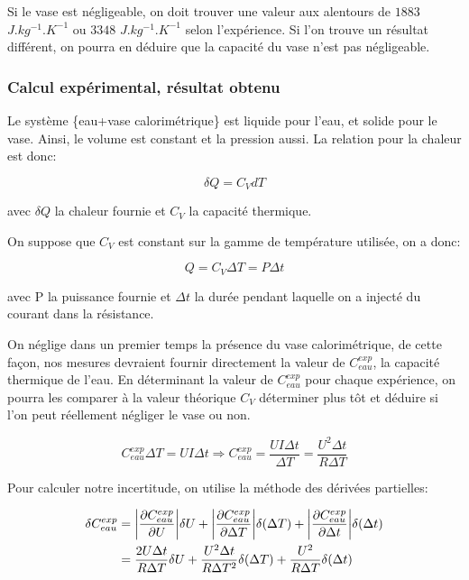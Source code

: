 \documentclass[12pt]{article}
\begin{document}
Si le vase est négligeable, on doit trouver une valeur aux alentours de $1883$ $J.kg^{-1}.K^{-1}$ ou $3348$ $J.kg^{-1}.K^{-1}$ selon l'expérience. Si l'on trouve un résultat différent, 
on pourra en déduire que la capacité du vase n'est pas négligeable.

\subsubsection{Calcul expérimental, résultat obtenu}
Le système \{eau+vase calorimétrique\} est liquide pour l'eau, et solide pour le vase.
Ainsi, le volume est constant et la pression aussi. La relation pour la chaleur est donc:

\begin{equation}
\delta Q=C_VdT
\end{equation}

avec $\delta Q$ la chaleur fournie et $C_V$ la capacité thermique. 

On suppose que $C_V$ est constant sur la gamme de température utilisée, on a donc:

\begin{equation}
Q = C_V\Delta T = P\Delta t
\end{equation}

avec P la puissance fournie et $\Delta t$ la durée pendant laquelle on a injecté du courant dans la résistance.

On néglige dans un premier temps la présence du vase calorimétrique, de cette façon, nos mesures devraient fournir directement la valeur de $C_{eau}^{exp}$, la capacité thermique de l'eau.
En déterminant la valeur de $C_{eau}^{exp}$ pour chaque expérience, on pourra les comparer à la valeur théorique $C_V$ déterminer plus tôt et déduire si l'on peut réellement négliger le vase ou non.

\begin{equation}
	C_{eau}^{exp} \Delta T = U I \Delta t \Rightarrow C_{eau}^{exp} = \frac{U I \Delta t}{\Delta T} = \frac{U^2\Delta t}{R \Delta T}
\end{equation}

\newpage
Pour calculer notre incertitude, on utilise la méthode des dérivées partielles:

\begin{align*}
	\delta C_{eau}^{exp} & = \abs{\frac{\partial C_{eau}^{exp}}{\partial U}} \delta U + \abs{\frac{\partial C_{eau}^{exp}}{\partial \Delta T}} \delta (\Delta T) + \abs{\frac{\partial C_{eau}^{exp}}{\partial \Delta t}} \delta (\Delta t)\\
	& = \frac{2U \Delta t}{R \Delta T} \delta U + \frac{U^2 \Delta t}{R \Delta T ^2} \delta (\Delta T) + \frac{U^2}{R \Delta T} \delta (\Delta t)\\
\end{align*}
\end{document}
